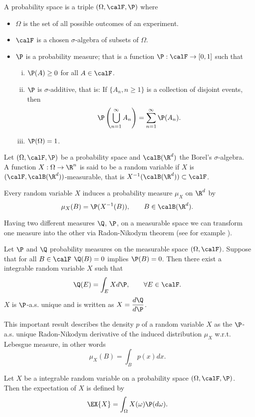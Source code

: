 	A probability space is a triple $(\Omega, \calF, \P)$ where
\begin{itemize}
	\item $\Omega$ is the set of all possible outcomes of an experiment.
	\item $\calF$ is a chosen $\sigma$-algebra of subsets of $\Omega$.
	\item $\P$ is a probability measure; that is a function $\P: \calF \to [0,1]$ such that
	\begin{enumerate}[(i)]
		\item
			$\P(A)\geq 0$ for all $A \in \calF$.
		\item
			$\P$ is $\sigma$-additive, that is: If $\{A_n,  n\geq 1 \}$ is a collection of disjoint events,
			then
				$$
					\P \left(
						\bigcup_{n=1}^{\infty} A_n
					\right)= \sum_{n=1}^{\infty}
						\P(A_n).
				$$
		\item
			$\P(\Omega) = 1$.
	\end{enumerate}
\end{itemize}
\begin{definition}
	Let $(\Omega, \calF, \P)$ be a probability space and $\calB(\R^d)$ the Borel's $\sigma$-algebra. A  function $X:\Omega \to \R^n$ is said to be a random variable if $X$ is $(\calF,\calB(\R^d))$-measurable, that is
	$
		X^{-1}(\calB(\R^d))\subset \calF
	$.
\end{definition}
	Every random variable $X$ induces a probability measure $\mu_X$ on $\R^d$ by
	$$
		\mu_{X}(B) = \P(X^{-1}(B)), \qquad B\in\calB(\R^d).
	$$ 
%

	Having two different measures $\Q$, $\P$, on a measurable space we can transform one measure into the
other via  Radon-Nikodym theorem  (see for example \cite[Thm. 10.1.2]{Williams1991}).

\begin{thm}
	Let $\P$ and $\Q$ probability measures on the measurable space $(\Omega,\calF)$. Suppose that for all
	$B\in\calF$ $\Q(B)=0$ implies $\P(B)=0$. Then there exist a integrable random variable $X$ such that
	$$
		\Q(E) = \int_{E}Xd\P, \qquad \forall E\in\calF.
	$$
	$X$ is $\P$-a.s. unique and is written as $\displaystyle X = \frac{d\Q}{d\P}$.
\end{thm}
	This important result describes the density $p$ of a random variable $X$ as the $\P$-a.s.
unique Radon-Nikodym derivative of the induced distribution $\mu_{X}$ w.r.t. Lebesgue measure, in other 
words
$$
	\mu_{X}(B)=\int_{B} p(x)dx.
$$

\begin{definition}[Expectation]
	Let $X$ be a integrable random variable on a probability space $(\Omega, \calF, \P)$. Then the expectation
	of $X$ is defined by
	\begin{equation*}
		\EX{X}= \int_{\Omega} X(\omega) \P(d\omega).
	\end{equation*}
\end{definition}
